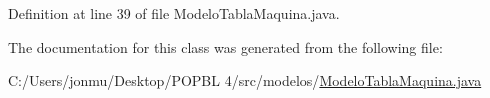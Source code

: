 Definition at line 39 of file Modelo\+Tabla\+Maquina.\+java.



The documentation for this class was generated from the following file\+:\begin{DoxyCompactItemize}
\item 
C\+:/\+Users/jonmu/\+Desktop/\+P\+O\+P\+B\+L 4/src/modelos/\mbox{\hyperlink{_modelo_tabla_maquina_8java}{Modelo\+Tabla\+Maquina.\+java}}\end{DoxyCompactItemize}
